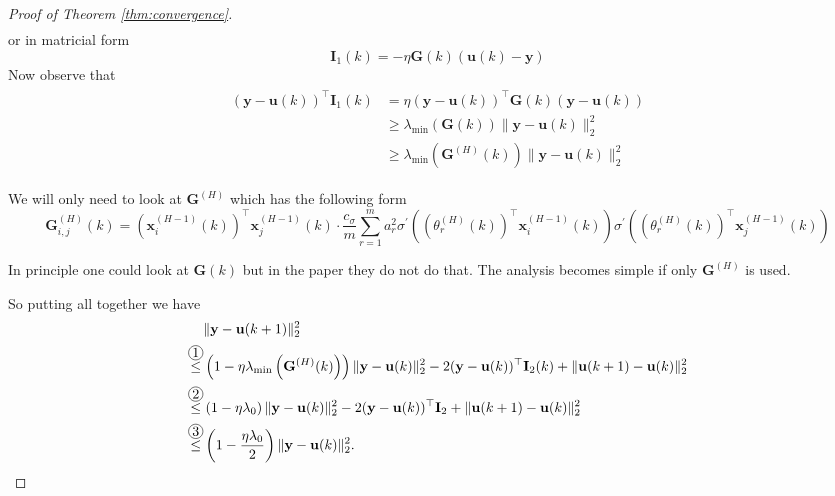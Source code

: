 \documentclass[11pt]{article}
\theoremstyle{plain}
\theoremstyle{definition}
\begin{document}
\begin{proof}[Proof of Theorem \ref{thm:convergence}]
\begin{align*}
\end{align*}
or in matricial form
\[
\mathbf{I}_{1}(k)=-\eta \mathbf{G}(k)(\mathbf{u}(k)-\mathbf{y})
\] 
Now observe that 
\begin{align}  \label{ineq:bound_Gh}
\begin{aligned}(\mathbf{y}-\mathbf{u}(k))^{\top} \mathbf{I}_{1}(k) &=\eta(\mathbf{y}-\mathbf{u}(k))^{\top} \mathbf{G}(k)(\mathbf{y}-\mathbf{u}(k)) \\ & \geq \lambda_{\min }(\mathbf{G}(k))\|\mathbf{y}-\mathbf{u}(k)\|_{2}^{2} \\ & \geq \lambda_{\min }\left(\mathbf{G}^{(H)}(k)\right)\|\mathbf{y}-\mathbf{u}(k)\|_{2}^{2} \end{aligned}
\end{align}

    We will only need to look at $\mathbf{G}^{(H)}$ which has the following form
\[
\mathbf{G}_{i, j}^{(H)}(k)=\left(\mathbf{x}_{i}^{(H-1)}(k)\right)^{\top} \mathbf{x}_{j}^{(H-1)}(k) \cdot \frac{c_{\sigma}}{m} \sum_{r=1}^{m} a_{r}^{2} \sigma^{\prime}\left(\left(\theta_{r}^{(H)}(k)\right)^{\top} \mathbf{x}_{i}^{(H-1)}(k)\right) \sigma^{\prime}\left(\left(\theta_{r}^{(H)}(k)\right)^{\top} \mathbf{x}_{j}^{(H-1)}(k)\right)
\] 

In principle one could look at $\mathbf{G}(k)$ but in the paper they do not do that. The analysis becomes simple if only $\mathbf{G}^{(H)}$ is used.

So putting all together we have
\begin{align*} 
\begin{aligned} &\|\mathbf{y}-\mathbf{u}(k+1)\|_{2}^{2} \\
    \circled{1}[\leq] &\left(1-\eta \lambda_{\min }\left(\mathbf{G}^{(H)}(k)\right)\right)\|\mathbf{y}-\mathbf{u}(k)\|_{2}^{2}-2(\mathbf{y}-\mathbf{u}(k))^{\top} \mathbf{I}_{2}(k)+\|\mathbf{u}(k+1)-\mathbf{u}(k)\|_{2}^{2} \\
    \circled{2}[\leq] & \left(1-\eta \lambda_{0}\right)\|\mathbf{y}-\mathbf{u}(k)\|_{2}^{2}-2(\mathbf{y}-\mathbf{u}(k))^{\top} \mathbf{I}_{2}+\|\mathbf{u}(k+1)-\mathbf{u}(k)\|_{2}^{2} \\
    \circled{3}[\leq] &\left(1-\frac{\eta \lambda_{0}}{2}\right)\|\mathbf{y}-\mathbf{u}(k)\|_{2}^{2}.
\end{aligned}
\begin{aligned}\end{aligned}
\end{align*}


\end{proof}
\end{document}
